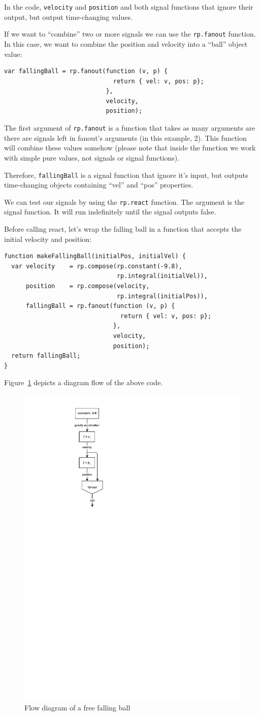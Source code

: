\documentclass[notitlepage]{article}
\begin{document}
In the code, \texttt{velocity} and \texttt{position} and both signal functions
that ignore their output, but output time-changing values.

If we want to ``combine'' two or more signals we can use the \texttt{rp.fanout}
function. In this case, we want to combine the position and velocity into a
``ball'' object value:

\begin{lstlisting}
var fallingBall = rp.fanout(function (v, p) {
                              return { vel: v, pos: p};
                            },
                            velocity,
                            position);
\end{lstlisting}

The first argument of \texttt{rp.fanout} is a function that takes as many
arguments are there are signals left in fanout's arguments (in this example,
2). This function will combine these values somehow (please note that inside
  the function we work with simple pure values, not signals or signal functions).

Therefore, \texttt{fallingBall} is a signal function that ignore it's input,
but outputs time-changing objects containing ``vel'' and ``pos'' properties.

We can test our signals by using the \texttt{rp.react} function.
The argument is the signal function. It will run indefinitely until the signal
outputs false.

Before calling react, let's wrap the falling ball in a function that accepts
the initial velocity and position:

\begin{lstlisting}
function makeFallingBall(initialPos, initialVel) {
  var velocity    = rp.compose(rp.constant(-9.8),
                               rp.integral(initialVel)),
      position    = rp.compose(velocity,
                               rp.integral(initialPos)),
      fallingBall = rp.fanout(function (v, p) {
                                return { vel: v, pos: p};
                              },
                              velocity,
                              position);
  return fallingBall;
}
\end{lstlisting}

Figure~\ref{fig:falling-ball} depicts a diagram flow of the above code.

\begin{figure}
    \centering
    \includegraphics[width=0.2\linewidth,bb=0 0 65 215]{images/falling-ball.pdf}
    \caption{Flow diagram of a free falling ball}
    \label{fig:falling-ball}
\end{figure}
\end{document}
